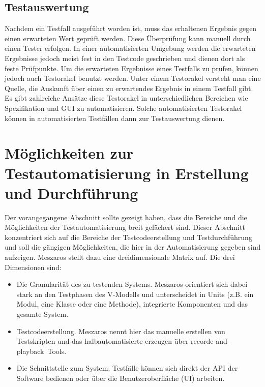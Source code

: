 \subsection{Testauswertung}
\label{subsec:testauswertung}
Nachdem ein Testfall ausgeführt worden ist, muss das erhaltenen Ergebnis gegen einen erwarteten Wert geprüft werden.
Diese Überprüfung kann manuell durch einen Tester erfolgen. 
In einer automatisierten Umgebung werden die erwarteten Ergebnisse jedoch meist fest in den Testcode geschrieben und dienen dort als feste Prüfpunkte.
Um die erwarteten Ergebnisse eines Testfalls zu prüfen, können jedoch auch Testorakel benutzt werden. Unter einem Testorakel versteht man eine Quelle, die Auskunft über einen zu erwartendes Ergebnis in einem Testfall gibt. Es gibt zahlreiche Ansätze diese Testorakel in unterschiedlichen Bereichen wie Spezifikation und GUI zu automatisieren. \cite{memon_automated_2000} \cite{richardson_specification-based_1992}
\cite{shahamiri_comparative_2009} Solche automatisierten Testorakel können in automatisierten Testfällen dann zur Testauswertung dienen.


\section{Möglichkeiten zur Testautomatisierung in Erstellung und Durchführung}
\label{sec:möglichkeiten_zur_testautomatisierung_in_erstellung_und_durchführung}
Der vorangegangene Abschnitt sollte gezeigt haben, dass die Bereiche und die Möglichkeiten der Testautomatisierung breit gefächert sind. Dieser Abschnitt konzentriert sich auf die Bereiche der Testcodeerstellung und Testdurchführung und soll die gängigen Möglichkeiten, die hier in der Automatisierung gegeben sind aufzeigen. Meszaros \cite{meszaros_agile_2003} stellt dazu eine dreidimensionale Matrix auf.
Die drei Dimensionen sind:

\begin{itemize}
	  \itemsep0pt
      \item Die Granularität des zu testenden Systems. Meszaros orientiert sich dabei stark an den Testphasen des V-Modells und unterscheidet in Units (z.B. ein Modul, eine Klasse oder eine Methode), integrierte Komponenten und das gesamte System.
      \item Testcodeerstellung. Meszaros nennt hier das manuelle erstellen von Testskripten und das halbautomatisierte erzeugen über \glqq recorde-and-playback\grqq\ Tools. 
      \item Die Schnittstelle zum System. Testfälle können sich direkt der API der Software bedienen oder über die Benutzeroberfläche (UI) arbeiten.
\end{itemize}

